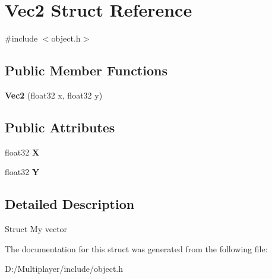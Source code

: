 \hypertarget{struct_vec2}{}\section{Vec2 Struct Reference}
\label{struct_vec2}


{\ttfamily \#include $<$object.\+h$>$}

\subsection*{Public Member Functions}
\begin{DoxyCompactItemize}
\item 
\mbox{\label{struct_vec2_a31ddae74bc80039c0a08f3e8a29fd924}} 
{\bfseries Vec2} (float32 x, float32 y)
\end{DoxyCompactItemize}
\subsection*{Public Attributes}
\begin{DoxyCompactItemize}
\item 
\mbox{\label{struct_vec2_a186c8e91644c835bf422a09de2a7cedc}} 
float32 {\bfseries X}
\item 
\mbox{\label{struct_vec2_adfc6433289a436891298d87144a0d02a}} 
float32 {\bfseries Y}
\end{DoxyCompactItemize}


\subsection{Detailed Description}
Struct My vector 

The documentation for this struct was generated from the following file\+:\begin{DoxyCompactItemize}
\item 
D\+:/\+Multiplayer/include/object.\+h\end{DoxyCompactItemize}
